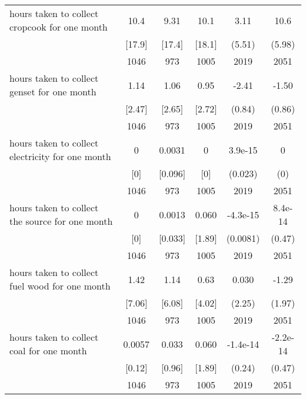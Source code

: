\begin{table}[htbp]
\begin{tabular*}{0.9\hsize}{@{\hskip\tabcolsep\extracolsep\fill}l*{1}{ccccc}}
hours taken to collect cropcook for one month&     10.4&     9.31&     10.1&     3.11         &     10.6\sym{*}  \\
                                &   [17.9]&   [17.4]&   [18.1]&   (5.51)         &   (5.98)         \\
                                &     1046&      973&     1005&     2019         &     2051         \\
hours taken to collect genset for one month&     1.14&     1.06&     0.95&    -2.41\sym{***}&    -1.50\sym{*}  \\
                                &   [2.47]&   [2.65]&   [2.72]&   (0.84)         &   (0.86)         \\
                                &     1046&      973&     1005&     2019         &     2051         \\
hours taken to collect electricity for one month&        0&   0.0031&        0&  3.9e-15         &        0         \\
                                &      [0]&  [0.096]&      [0]&  (0.023)         &      (0)         \\
                                &     1046&      973&     1005&     2019         &     2051         \\
hours taken to collect the source for one month&        0&   0.0013&    0.060& -4.3e-15         &  8.4e-14         \\
                                &      [0]&  [0.033]&   [1.89]& (0.0081)         &   (0.47)         \\
                                &     1046&      973&     1005&     2019         &     2051         \\
hours taken to collect fuel wood for one month&     1.42&     1.14&     0.63&    0.030         &    -1.29         \\
                                &   [7.06]&   [6.08]&   [4.02]&   (2.25)         &   (1.97)         \\
                                &     1046&      973&     1005&     2019         &     2051         \\
hours taken to collect coal for one month&   0.0057&    0.033&    0.060& -1.4e-14         & -2.2e-14         \\
                                &   [0.12]&   [0.96]&   [1.89]&   (0.24)         &   (0.47)         \\
                                &     1046&      973&     1005&     2019         &     2051         \\

\end{tabular*}
\end{table}

